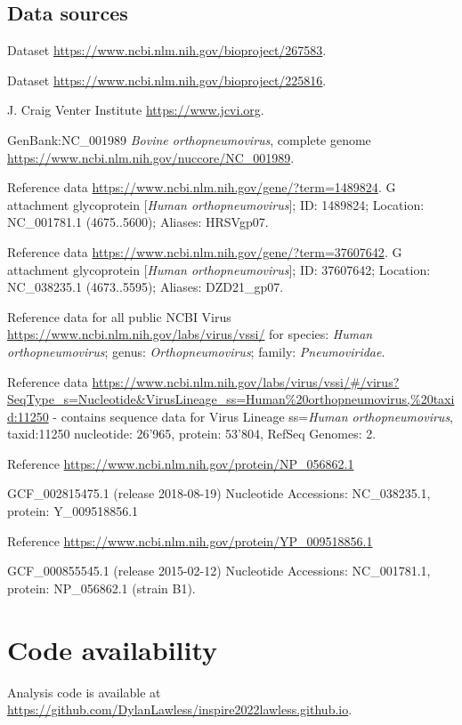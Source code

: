 \documentclass{article} %
\begin{document}
\subsection{Data sources}
\begin{description}[noitemsep]
\item Dataset \url{https://www.ncbi.nlm.nih.gov/bioproject/267583}.
\item Dataset \url{https://www.ncbi.nlm.nih.gov/bioproject/225816}.
\item J. Craig Venter Institute \url{https://www.jcvi.org}.
\item GenBank:NC\_001989 \textit{Bovine orthopneumovirus}, complete genome \url{https://www.ncbi.nlm.nih.gov/nuccore/NC_001989}.
\item Reference data \url{https://www.ncbi.nlm.nih.gov/gene/?term=1489824}.
G attachment glycoprotein [\textit{Human orthopneumovirus}]; ID: 1489824; Location: NC\_001781.1 (4675..5600); Aliases: HRSVgp07.
\item Reference data \url{https://www.ncbi.nlm.nih.gov/gene/?term=37607642}. 
G attachment glycoprotein [\textit{Human orthopneumovirus}]; ID: 37607642; Location: NC\_038235.1 (4673..5595); Aliases: DZD21\_gp07.
\item Reference data for all public NCBI Virus 
\url{https://www.ncbi.nlm.nih.gov/labs/virus/vssi/} for species: \textit{Human orthopneumovirus}; genus: \textit{Orthopneumovirus}; family: \textit{Pneumoviridae}.
\item Reference data \url{https://www.ncbi.nlm.nih.gov/labs/virus/vssi/#/virus?SeqType_s=Nucleotide&VirusLineage_ss=Human\%20orthopneumovirus,\%20taxid:11250}
- contains sequence data for 
Virus Lineage ss=\textit{Human orthopneumovirus}, taxid:11250
nucleotide: 26’965, 
protein: 53’804, 
RefSeq Genomes: 2.
\item Reference \url{https://www.ncbi.nlm.nih.gov/protein/NP_056862.1}
\item GCF\_002815475.1	(release 2018-08-19) Nucleotide Accessions: NC\_038235.1, protein: Y\_009518856.1
\item Reference \url{https://www.ncbi.nlm.nih.gov/protein/YP_009518856.1}
\item GCF\_000855545.1	(release 2015-02-12) Nucleotide Accessions: NC\_001781.1, protein: NP\_056862.1 (strain B1).
\end{description}

\section{Code availability}
Analysis code is available at \url{https://github.com/DylanLawless/inspire2022lawless.github.io}.
\end{document}
